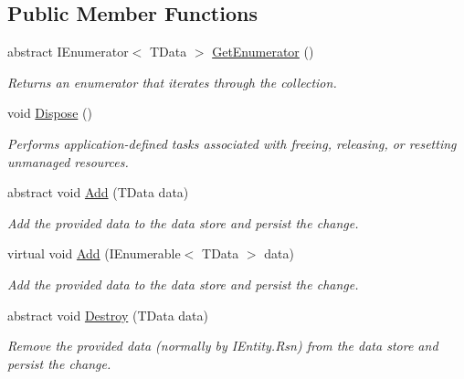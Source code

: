 \subsection*{Public Member Functions}
\begin{DoxyCompactItemize}
\item 
abstract I\+Enumerator$<$ T\+Data $>$ \hyperlink{classCqrs_1_1Azure_1_1BlobStorage_1_1StorageStore_a2eb689ea51d586309b79d6cbac05b616_a2eb689ea51d586309b79d6cbac05b616}{Get\+Enumerator} ()
\begin{DoxyCompactList}\small\item\em Returns an enumerator that iterates through the collection. \end{DoxyCompactList}\item 
void \hyperlink{classCqrs_1_1Azure_1_1BlobStorage_1_1StorageStore_a3fddffcffd2bd3c79212bb6ef2cdc422_a3fddffcffd2bd3c79212bb6ef2cdc422}{Dispose} ()
\begin{DoxyCompactList}\small\item\em Performs application-\/defined tasks associated with freeing, releasing, or resetting unmanaged resources. \end{DoxyCompactList}\item 
abstract void \hyperlink{classCqrs_1_1Azure_1_1BlobStorage_1_1StorageStore_af56bdbd7fa6650aaef5c0bab9ed55f1a_af56bdbd7fa6650aaef5c0bab9ed55f1a}{Add} (T\+Data data)
\begin{DoxyCompactList}\small\item\em Add the provided {\itshape data}  to the data store and persist the change. \end{DoxyCompactList}\item 
virtual void \hyperlink{classCqrs_1_1Azure_1_1BlobStorage_1_1StorageStore_a989d749e5f9efc10b1a416feec02657d_a989d749e5f9efc10b1a416feec02657d}{Add} (I\+Enumerable$<$ T\+Data $>$ data)
\begin{DoxyCompactList}\small\item\em Add the provided {\itshape data}  to the data store and persist the change. \end{DoxyCompactList}\item 
abstract void \hyperlink{classCqrs_1_1Azure_1_1BlobStorage_1_1StorageStore_a9879b4ab18c2a33d7e20bc0b3a734195_a9879b4ab18c2a33d7e20bc0b3a734195}{Destroy} (T\+Data data)
\begin{DoxyCompactList}\small\item\em Remove the provided {\itshape data}  (normally by I\+Entity.\+Rsn) from the data store and persist the change. \end{DoxyCompactList}\item 

\end{DoxyCompactItemize}
